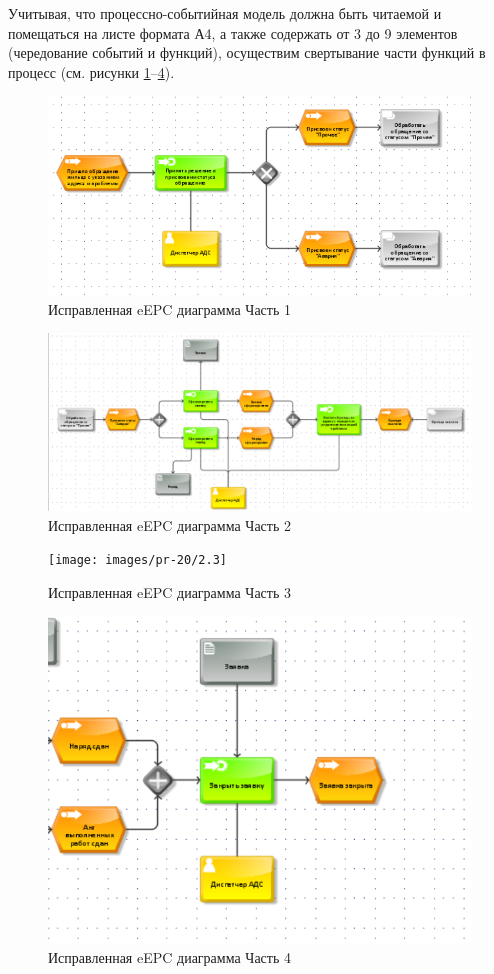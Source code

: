 \documentclass[a4paper,14pt]{extarticle}
\begin{document}
\begin{problem*}
	
	Учитывая, что процессно-событийная модель должна быть
	читаемой и помещаться на листе формата А4, а также содержать от 3 до 9
	элементов (чередование событий и функций), осуществим свертывание части
	функций в процесс (см. рисунки \ref{fig:2.1}--\ref{fig:2.4}).
	
	\begin{figure}[h!]
		\centering
		\includegraphics[width=0.7\linewidth]{images/pr-20/2.1}
		\caption{Исправленная eEPC диаграмма
 Часть 1}
		\label{fig:2.1}
	\end{figure}
	
	\begin{figure}[h!]
		\centering
		\includegraphics[width=0.7\linewidth]{images/pr-20/2.2}
		\caption{Исправленная eEPC диаграмма
 Часть 2}
		\label{fig:2.2}
	\end{figure}
	
	\begin{figure}[h!]
		\centering
		\texttt{[image: images/pr-20/2.3]}
		\caption{Исправленная eEPC диаграмма
 Часть 3}
		\label{fig:2.3}
	\end{figure}
	
	\begin{figure}[h!]
		\centering
		\includegraphics[width=0.7\linewidth]{images/pr-20/2.4}
		\caption{Исправленная eEPC диаграмма
 Часть 4}
		\label{fig:2.4}
	\end{figure}
\end{problem*}
\end{document}
